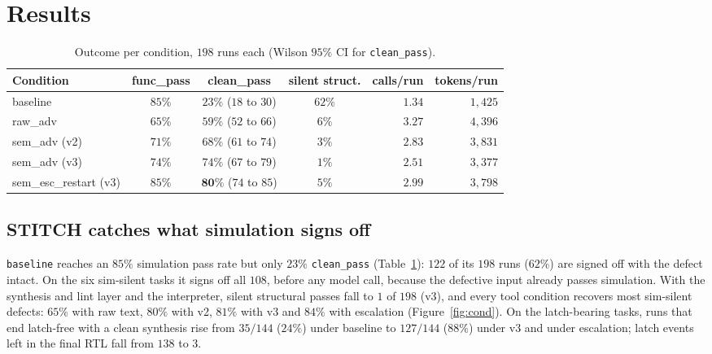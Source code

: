 \documentclass[11pt]{article}
\begin{document}
\section{Results}
\label{sec:results}

\begin{table}[htbp]
\centering
\caption{Outcome per condition, $198$ runs each (Wilson $95\%$ CI for
\texttt{clean\_pass}).}
\label{tab:pooled}
\small
\begin{tabularx}{\linewidth}{@{} X c c c r r @{}}
\toprule
\textbf{Condition} & \textbf{func\_pass} & \textbf{clean\_pass} & \textbf{silent struct.} & \textbf{calls/run} & \textbf{tokens/run} \\
\midrule
baseline               & $85\%$ & $23\%$ ($18$ to $30$) & $62\%$ & $1.34$ & $1{,}425$ \\
raw\_adv               & $65\%$ & $59\%$ ($52$ to $66$) & $6\%$  & $3.27$ & $4{,}396$ \\
sem\_adv (v2)          & $71\%$ & $68\%$ ($61$ to $74$) & $3\%$  & $2.83$ & $3{,}831$ \\
sem\_adv (v3)          & $74\%$ & $74\%$ ($67$ to $79$) & $1\%$  & $2.51$ & $3{,}377$ \\
sem\_esc\_restart (v3) & $85\%$ & $\mathbf{80\%}$ ($74$ to $85$) & $5\%$ & $2.99$ & $3{,}798$ \\
\bottomrule
\end{tabularx}
\end{table}

\subsection{STITCH catches what simulation signs off}
\label{sec:res-caught}

\texttt{baseline} reaches an $85\%$ simulation pass rate but only $23\%$
\texttt{clean\_pass} (Table~\ref{tab:pooled}): $122$ of its $198$ runs
($62\%$) are signed off with the defect intact. On the six sim-silent tasks it
signs off all $108$, before any model call, because the defective input
already passes simulation. With the synthesis and lint layer and the
interpreter, silent structural passes fall to $1$ of $198$ (v3), and every
tool condition recovers most sim-silent defects: $65\%$ with raw text, $80\%$
with v2, $81\%$ with v3 and $84\%$ with escalation
(Figure~\ref{fig:cond}). On the latch-bearing tasks, runs that end latch-free
with a clean synthesis rise from $35/144$ ($24\%$) under baseline to $127/144$
($88\%$) under v3 and under escalation; latch events left in the final RTL
fall from $138$ to $3$.
\end{document}
